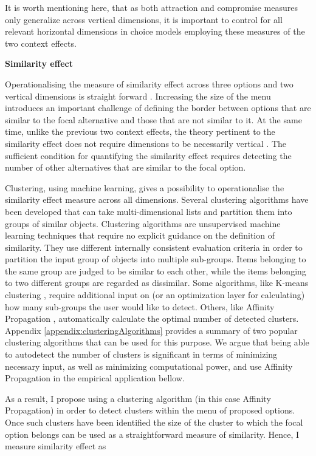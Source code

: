 \documentclass[a4paper,12pt]{article}
\begin{document}
 It is worth mentioning here, that as both attraction and compromise measures only generalize across vertical dimensions, it is important to control for all relevant horizontal dimensions in choice models employing these measures of the two context effects.

 \textbf{Similarity effect}

 Operationalising the measure of similarity effect across three options and two vertical dimensions is straight forward \citep{roodrkerkEtAl11}. Increasing the size of the menu introduces an important challenge of defining the border between options that are similar to the focal alternative and those that are not similar to it. At the same time, unlike the previous two context effects, the theory pertinent to the similarity effect does not require dimensions to be necessarily vertical \citep{tversky1972elimination}. The sufficient condition for quantifying the similarity effect requires detecting the number of other alternatives that are similar to the focal option.

 Clustering, using machine learning, gives a possibility to operationalise the similarity effect measure across all dimensions. Several clustering algorithms have been developed that can take multi-dimensional lists and partition them into groups of similar objects. Clustering algorithms are unsupervised machine learning techniques that require no explicit guidance on the definition of similarity. They use different internally consistent evaluation criteria in order to partition the input group of objects into multiple sub-groups. Items belonging to the same group are judged to be similar to each other, while the items belonging to two different groups are regarded as dissimilar. Some algorithms, like K-means clustering \citep{lloyd82}, require additional input on (or an optimization layer for calculating) how many sub-groups the user would like to detect. Others, like Affinity Propagation \citep{freyDueck07}, automatically calculate the optimal number of detected clusters. Appendix \ref{appendix:clusteringAlgorithms} provides a summary of two popular clustering algorithms that can be used for this purpose. We argue that being able to autodetect the number of clusters is significant in terms of minimizing necessary input, as well as minimizing computational power, and use Affinity Propagation in the empirical application bellow. 

 As a result, I propose using a clustering algorithm (in this case Affinity Propagation) in order to detect clusters within the menu of proposed options. Once such clusters have been identified the size of the cluster to which the focal option belongs can be used as a straightforward measure of similarity. Hence, I measure similarity effect as
\end{document}
